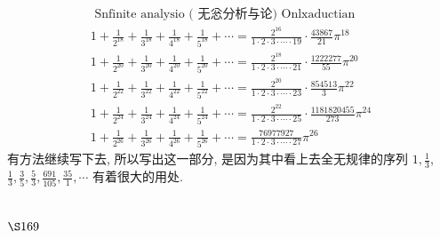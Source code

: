 \[
\begin{gathered}
\text { Snfinite analysio }(\text { 无忩分析与论) Onlxaductian } \\
1+\frac{1}{2^{18}}+\frac{1}{3^{18}}+\frac{1}{4^{18}}+\frac{1}{5^{18}}+\cdots=\frac{2^{16}}{1 \cdot 2 \cdot 3 \cdot \cdots \cdot 19} \cdot \frac{43867}{21} \pi^{18} \\
1+\frac{1}{2^{20}}+\frac{1}{3^{20}}+\frac{1}{4^{20}}+\frac{1}{5^{20}}+\cdots=\frac{2^{18}}{1 \cdot 2 \cdot 3 \cdot \cdots \cdot 21} \cdot \frac{1222277}{55} \pi^{20} \\
1+\frac{1}{2^{22}}+\frac{1}{3^{22}}+\frac{1}{4^{22}}+\frac{1}{5^{22}}+\cdots=\frac{2^{20}}{1 \cdot 2 \cdot 3 \cdot \cdots \cdot 23} \cdot \frac{854513}{3} \pi^{22} \\
1+\frac{1}{2^{24}}+\frac{1}{3^{24}}+\frac{1}{4^{24}}+\frac{1}{5^{24}}+\cdots=\frac{2^{22}}{1 \cdot 2 \cdot 3 \cdot \cdots \cdot 25} \cdot \frac{1181820455}{273} \pi^{24} \\
1+\frac{1}{2^{26}}+\frac{1}{3^{26}}+\frac{1}{4^{26}}+\frac{1}{5^{26}}+\cdots=\frac{76977927}{1 \cdot 2 \cdot 3 \cdot \cdots \cdot 27} \pi^{26}
\end{gathered}
\]
有方法继续写下去, 所以写出这一部分, 是因为其中看上去全无规律的序列 $1, \frac{1}{3}$, $\frac{1}{3}, \frac{3}{5}, \frac{5}{3}, \frac{691}{105}, \frac{35}{1}, \cdots$ 有着很大的用处.

\section{$\S 169$}

